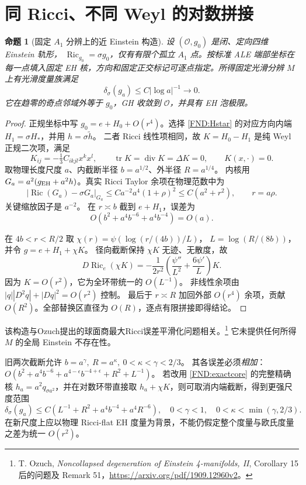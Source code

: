 \documentclass[UTF8,fontset=fandol,zihao=-4,oneside,openany]{ctexbook}
\theoremstyle{cjkplain}
\newtheorem{proposition}[theorem]{命题}
\numberwithin{equation}{chapter}
\DeclareMathOperator{\Ric}{Ric}
\DeclareMathOperator{\tr}{tr}
\begin{document}
\section{同 Ricci、不同 Weyl 的对数拼接}
\begin{proposition}[固定 \(A_1\) 分辨上的近 Einstein 构造]\label{FND:A1construction}
设 \((\mathcal O,g_0)\) 是闭、定向四维 Einstein 轨形，
\(\Ric_{g_0}=\sigma g_0\)，仅有有限个孤立 \(A_1\) 点。按标准 ALE 端部坐标在每一点填入固定 EH 核，方向和固定正交标记可逐点指定。所得固定光滑分辨 \(M\) 上有光滑度量族满足
\[
\delta_\sigma(g_a)\le C|\log a|^{-1}\to0 .
\]
它在趋零的奇点邻域外等于 \(g_0\)，GH 收敛到 \(\mathcal O\)，并具有 EH 泡极限。
\end{proposition}
\begin{proof}
正规坐标中写 \(g_0=e+H_0+O(r^4)\)。选择 \eqref{FND:Hstar} 的对应方向内端 \(H_1=\sigma H_*\)，并用 \(h=\sigma\widetilde h\)。
二者 Ricci 线性项相同，故
\(K=H_0-H_1\) 是纯 Weyl 正规二次项，满足
\[
K_{ij}=-\tfrac13C_{ikjl}x^kx^l,\qquad
\tr K=\operatorname{div}K=\Delta K=0,\qquad K(x,\cdot)=0.
\]
取物理长度尺度 \(a\)、内截断半径 \(b=a^{1/2}\)、外半径 \(R=a^{1/4}\)。
内核用
\(G_a=a^2(g_{\rm EH}+a^2h)\)。真实 Ricci Taylor 余项在物理范数中为
\[
|\Ric(G_a)-\sigma G_a|_{G_a}
\le Ca^{-2}a^4(1+\rho)^2
\le C(a^2+r^2),\qquad r=a\rho .
\]
关键缩放因子是 \(a^{-2}\)。
在 \(r\asymp b\) 截到 \(e+H_1\)，误差为
\[
O\!\left(b^2+a^4b^{-6}+a^4b^{-4}\right)=O(a).
\]

在 \(4b<r<R/2\) 取
\(\chi(r)=\psi(\log(r/(4b))/L)\)，
\(L=\log(R/(8b))\)，并令 \(g=e+H_1+\chi K\)。
径向截断保持 \(\chi K\) 无迹、无散度，故
\begin{equation}\label{FND:logoperator}
D\Ric_e(\chi K)
=-\frac1{2r^2}\left(\frac{\psi''}{L^2}
+\frac{6\psi'}L\right)K.
\end{equation}
因为 \(K=O(r^2)\)，它为全环带统一的 \(O(L^{-1})\)。
非线性余项由
\(|q||D^2q|+|Dq|^2=O(r^2)\) 控制。
最后于 \(r\asymp R\) 加回外部 \(O(r^4)\) 余项，贡献 \(O(R^2)\)。全部替换区直径为 \(O(R)\)，逐点有限拼接即得结论。
\end{proof}
该构造与Ozuch提出的球面商最大Ricci误差平滑化问题相关。\footnote{T. Ozuch, \emph{Noncollapsed degeneration of Einstein 4-manifolds, II}, Corollary 15 后的问题及 Remark 51，\url{https://arxiv.org/pdf/1909.12960v2}。}
它未提供任何所得 \(M\) 的全局 Einstein 不存在性。

旧两次截断允许
\(b=a^\gamma,\ R=a^\kappa,\ 0<\kappa<\gamma<2/3\)。
其各误差必须\emph{相加}：
\(O(b^2+a^4b^{-6}+a^{4-\epsilon}b^{-4+\epsilon}+R^2+L^{-1})\)。
若改用 \eqref{FND:exactcore} 的完整精确核
\(h_a=a^2q_{\sigma a^2}\)，并在对数环带直接取 \(h_a+\chi K\)，则可取消内端截断，得到更强尺度范围
\begin{equation}\label{FND:fullcorebound}
\delta_\sigma(g_a)\le
C\left(L^{-1}+R^2+a^4b^{-4}+a^4R^{-6}\right),
\quad
0<\gamma<1,\quad0<\kappa<\min(\gamma,2/3).
\end{equation}
在新尺度上应以物理 Ricci-flat EH 度量为背景，不能仍假定整个度量与欧氏度量之差为统一 \(O(r^2)\)。
\end{document}

